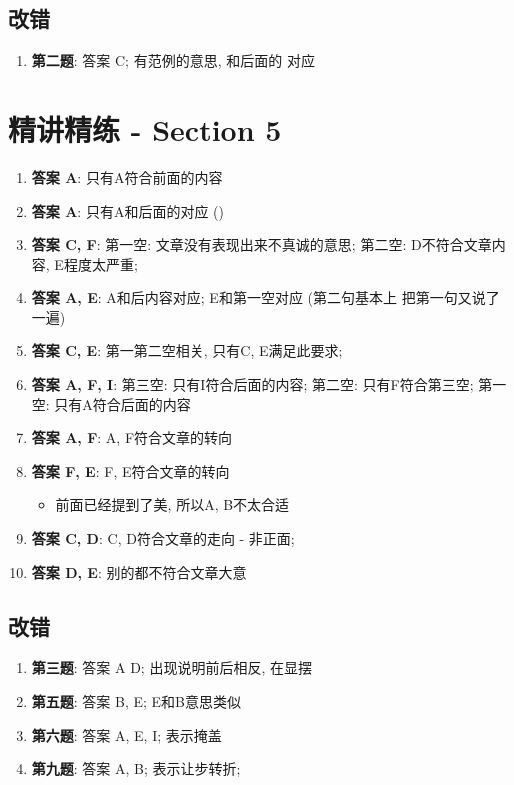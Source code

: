   \subsection{改错}

    \begin{enumerate}
      \item \textbf{第二题}: 答案 C; 有范例的意思, 和后面的
      对应
    \end{enumerate}

\section{精讲精练 - Section 5}

  \begin{enumerate}
    \item \textbf{答案 A}: 只有A符合前面的内容
    \item \textbf{答案 A}: 只有A和后面的对应
    ()
    \item \textbf{答案 C, F}: 第一空: 文章没有表现出来不真诚的意思;
    第二空: D不符合文章内容, E程度太严重;
    \item \textbf{答案 A, E}: A和后内容对应; E和第一空对应 (第二句基本上
    把第一句又说了一遍)
    \item \textbf{答案 C, E}: 第一第二空相关, 只有C, E满足此要求;
    \item \textbf{答案 A, F, I}: 第三空: 只有I符合后面的内容; 第二空: 只有F符合第三空;
    第一空: 只有A符合后面的内容
    \item \textbf{答案 A, F}: A, F符合文章的转向
    \item \textbf{答案 F, E}: F, E符合文章的转向
    \begin{itemize}
      \item 前面已经提到了美, 所以A, B不太合适
    \end{itemize}

    \item \textbf{答案 C, D}: C, D符合文章的走向 - 非正面;
    \item \textbf{答案 D, E}: 别的都不符合文章大意
  \end{enumerate}

  \subsection{改错}

    \begin{enumerate}
      \item \textbf{第三题}: 答案 A D; 出现说明前后相反, 
      在显摆
      \item \textbf{第五题}: 答案 B, E; E和B意思类似
      \item \textbf{第六题}: 答案 A, E, I; 表示掩盖
      \item \textbf{第九题}: 答案 A, B; 表示让步转折;
    \end{enumerate}

